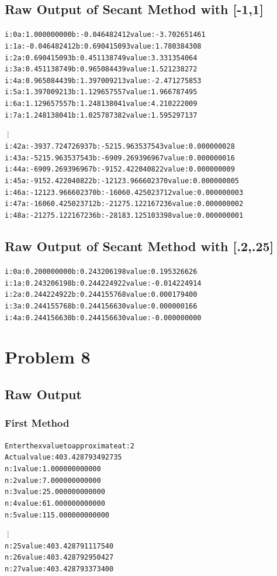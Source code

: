 \documentclass[11pt]{article} %
\begin{document}
\subsection*{Raw Output of Secant Method with [-1,1]}
\begin{alltt}
i: 0	a: 1.000000000	b: -0.046482412	value: -3.702651461
i: 1	a: -0.046482412	b: 0.690415093	value: 1.780384308
i: 2	a: 0.690415093	b: 0.451138749	value: 3.331354064
i: 3	a: 0.451138749	b: 0.965084439	value: 1.521238272
i: 4	a: 0.965084439	b: 1.397009213	value: -2.471275853
i: 5	a: 1.397009213	b: 1.129657557	value: 1.966787495
i: 6	a: 1.129657557	b: 1.248138041	value: 4.210222009
i: 7	a: 1.248138041	b: 1.025787382	value: 1.595297137

\vdots
i: 42	a: -3937.724726937	b: -5215.963537543	value: 0.000000028
i: 43	a: -5215.963537543	b: -6909.269396967	value: 0.000000016
i: 44	a: -6909.269396967	b: -9152.422040822	value: 0.000000009
i: 45	a: -9152.422040822	b: -12123.966602370	value: 0.000000005
i: 46	a: -12123.966602370	b: -16060.425023712	value: 0.000000003
i: 47	a: -16060.425023712	b: -21275.122167236	value: 0.000000002
i: 48	a: -21275.122167236	b: -28183.125103398	value: 0.000000001

\end{alltt}
\subsection*{Raw Output of Secant Method with [.2,.25]}
\begin{alltt}

i: 0	a: 0.200000000	b: 0.243206198	value: 0.195326626
i: 1	a: 0.243206198	b: 0.244224922	value: -0.014224914
i: 2	a: 0.244224922	b: 0.244155768	value: 0.000179400
i: 3	a: 0.244155768	b: 0.244156630	value: 0.000000166
i: 4	a: 0.244156630	b: 0.244156630	value: -0.000000000

\end{alltt}
\section*{Problem 8}
\subsection*{Raw Output}
\subsubsection*{First Method}
\begin{alltt}
Enter the x value to approximate at: 2
Actual value: 403.428793492735 
n: 1	value: 1.000000000000
n: 2	value: 7.000000000000
n: 3	value: 25.000000000000
n: 4	value: 61.000000000000
n: 5	value: 115.000000000000

\vdots
n: 25	value: 403.428791117540
n: 26	value: 403.428792950427
n: 27	value: 403.428793373400
\end{alltt}
\end{document}

